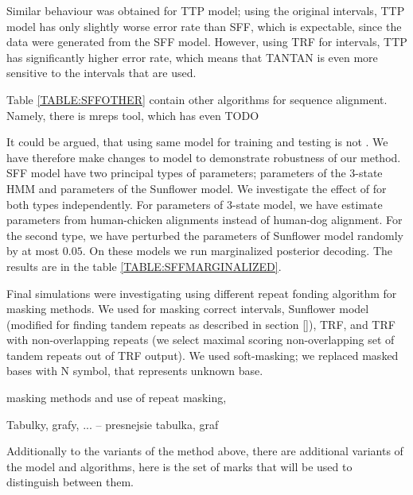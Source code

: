 Similar behaviour was obtained for TTP model; using the original intervals, TTP
model has only slightly worse error rate than SFF, which is expectable, since
the data were generated from the SFF model. However, using TRF for intervals,
TTP has significantly higher error rate, which means that TANTAN is even more
sensitive to the intervals that are used. 

Table \ref{TABLE:SFFOTHER} contain other algorithms for sequence alignment. Namely, 
there is mreps tool\cite{}, which has even  TODO

It could be argued, that using same model for training and testing is not
. We have therefore make changes to model to demonstrate
robustness of our method. SFF model have two principal types of parameters;
parameters of the 3-state HMM and parameters of the Sunflower model. We
investigate the effect of  for both types
independently. For parameters of 3-state model, we have estimate parameters
from human-chicken alignments instead of human-dog alignment. For the second
type, we have perturbed the parameters of Sunflower model randomly by at most
$0.05$. On these models we run marginalized posterior decoding. The results are
in the table \ref{TABLE:SFFMARGINALIZED}.

Final simulations were investigating using different repeat fonding algorithm
for masking methods. We used for masking correct intervals, Sunflower model
(modified for finding tandem repeats as described in section \ref{}), TRF, and
TRF with non-overlapping repeats (we select maximal scoring non-overlapping set
of tandem repeats out of TRF output). We used soft-masking; we replaced masked
bases with N symbol, that represents unknown base.

masking methods and use of repeat masking,


\begin{reformulate*}
Tabulky, grafy, ... -- presnejsie tabulka, graf
\end{reformulate*}
\def\M{$^\circ$} %
\def\MM{$^{\circ\circ\circ}$} %
\def\D{$^{\circ\circ}$} %
\def\DD{$^{\dagger}$} %
\def\R{$^{\yen}$}
\def\RR{$^{\yen\yen}$}
\def\CC#1{\multicolumn{1}{c}{#1}} %
\def\S{$^{\star}$}
Additionally to the variants of the method above, there are additional variants
of the model and algorithms, here is the set of marks that will be used to
distinguish between them.

